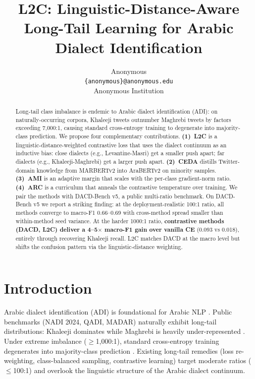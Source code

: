 \documentclass[11pt,a4paper,twocolumn]{article}
\title{L2C: Linguistic-Distance-Aware Long-Tail Learning for Arabic Dialect Identification}
\author{Anonymous \\
  \texttt{\{anonymous\}@anonymous.edu} \\
  Anonymous Institution}
\date{}
\newcommand{\method}{L2C}
\newcommand{\bench}{DACD-Bench}
\newcommand{\ceda}{CEDA}
\newcommand{\ami}{AMI}
\newcommand{\arc}{ARC}
\begin{document}
\maketitle

\begin{abstract}
Long-tail class imbalance is endemic to Arabic dialect identification (ADI): on
naturally-occurring corpora, Khaleeji tweets outnumber Maghrebi tweets by
factors exceeding 7{,}000:1, causing standard cross-entropy training to
degenerate into majority-class prediction. We propose four complementary
contributions. \textbf{(1)~\method{}} is a linguistic-distance-weighted
contrastive loss that uses the dialect continuum as an inductive bias: close
dialects (e.g., Levantine-Masri) get a smaller push apart; far dialects
(e.g., Khaleeji-Maghrebi) get a larger push apart. \textbf{(2)~\ceda{}}
distills Twitter-domain knowledge from MARBERTv2 into AraBERTv2 on
minority samples. \textbf{(3)~\ami{}} is an adaptive margin that scales
with the per-class gradient-norm ratio. \textbf{(4)~\arc{}} is a
curriculum that anneals the contrastive temperature over training.
We pair the methods with \bench{} v5, a public multi-ratio benchmark.
On \bench{} v5 we report a striking finding: at the deployment-realistic
100:1 ratio, all methods converge to macro-F1 0.66--0.69 with cross-method
spread smaller than within-method seed variance. At the harder 1000:1
ratio, \textbf{contrastive methods (DACD, L2C) deliver a 4--5$\times$
macro-F1 gain over vanilla CE} (0.093 vs 0.018), entirely through
recovering Khaleeji recall. L2C matches DACD at the macro level but
shifts the confusion pattern via the linguistic-distance weighting.
\end{abstract}

\section{Introduction}
Arabic dialect identification (ADI) is foundational for Arabic NLP
\citep{Al-Badrashiny2024,Bouamor2019}. Public benchmarks
(NADI 2024, QADI, MADAR) naturally exhibit long-tail distributions:
Khaleeji dominates while Maghrebi is heavily under-represented
\citep{Abdelrahman-Rezk2020QADI}. Under extreme imbalance
($\ge$1{,}000:1), standard cross-entropy training degenerates into
majority-class prediction \citep{menon2021long}. Existing long-tail
remedies (loss re-weighting, class-balanced sampling, contrastive
learning) target moderate ratios ($\le$100:1) and overlook the
linguistic structure of the Arabic dialect continuum.
\end{document}
